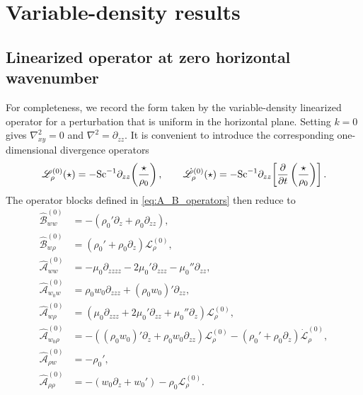 \section{Variable-density results}
\label{sec:variable_density}
\citet{khorasani-szekely-ascher-2015}

\subsection{Linearized operator at zero horizontal wavenumber}

For completeness, we record the form taken by the variable-density linearized
operator for a perturbation that is uniform in the horizontal plane. Setting
\(k=0\) gives \(\nabla_{xy}^{2}=0\) and \(\nabla^{2}=\partial_{zz}\). It is
convenient to introduce the corresponding one-dimensional divergence operators
\begin{equation}
  \mathscr{L}_{\rho}^{(0)}(\star)
  =-\mathrm{Sc}^{-1}\partial_{zz}\!\left(\frac{\star}{\rho_0}\right),
  \qquad
  \dot{\mathscr{L}}_{\rho}^{(0)}(\star)
  =-\mathrm{Sc}^{-1}\partial_{zz}\!\left[
    \frac{\partial}{\partial t}\left(\frac{\star}{\rho_0}\right)
  \right].
  \label{eq:vd_k0_divergence_operators}
\end{equation}
The operator blocks defined in \cref{eq:A_B_operators} then reduce to
\begin{subequations}
\label{eq:vd_k0_operators}
\begin{align}
  \widehat{\mathscr{B}}_{ww}^{(0)}
  &= -\left(\rho_0'\partial_z+\rho_0\partial_{zz}\right), \\
  \widehat{\mathscr{B}}_{w\rho}^{(0)}
  &= \left(\rho_0'+\rho_0\partial_z\right)
     \mathscr{L}_{\rho}^{(0)}, \\
  \widehat{\mathscr{A}}_{ww}^{(0)}
  &= -\mu_0\partial_{zzzz}-2\mu_0'\partial_{zzz}
     -\mu_0''\partial_{zz}, \\
  \widehat{\mathscr{A}}_{w_0w}^{(0)}
  &= \rho_0w_0\partial_{zzz}+(\rho_0w_0)'\partial_{zz}, \\
  \widehat{\mathscr{A}}_{w\rho}^{(0)}
  &= \left(\mu_0\partial_{zzz}+2\mu_0'\partial_{zz}
     +\mu_0''\partial_z\right)\mathscr{L}_{\rho}^{(0)}, \\
  \widehat{\mathscr{A}}_{w_0\rho}^{(0)}
  &= -\left((\rho_0w_0)'\partial_z+\rho_0w_0\partial_{zz}\right)
     \mathscr{L}_{\rho}^{(0)}
     -\left(\rho_0'+\rho_0\partial_z\right)
     \dot{\mathscr{L}}_{\rho}^{(0)}, \\
  \widehat{\mathscr{A}}_{\rho w}^{(0)}
  &= -\rho_0', \\
  \widehat{\mathscr{A}}_{\rho\rho}^{(0)}
  &= -\left(w_0\partial_z+w_0'\right)
     -\rho_0\mathscr{L}_{\rho}^{(0)}.
\end{align}
\end{subequations}

